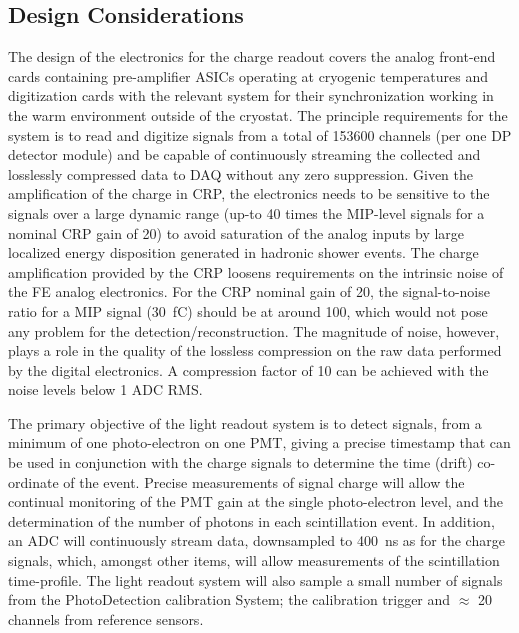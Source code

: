 \subsection{Design Considerations}
\label{sec:fddp-tpc-elec-des-consid}

The design of the electronics for the charge readout covers the analog front-end cards containing pre-amplifier ASICs operating at cryogenic temperatures and digitization cards with the relevant system for their synchronization working in the warm environment outside of the cryostat. The principle requirements for the system is to read and digitize signals from a total of \num{153600} channels (per one DP detector module) and be capable of continuously streaming the collected and losslessly compressed data to DAQ without any zero suppression. Given the amplification of the charge in CRP, the electronics needs to be sensitive to the signals over a large dynamic range (up-to \num{40} times the MIP-level signals for a nominal CRP gain of \num{20}) to avoid saturation of the analog inputs by large localized energy disposition generated in hadronic shower events. The charge amplification provided by the CRP loosens requirements on the intrinsic noise of the FE analog electronics. For the CRP nominal gain of \num{20}, the signal-to-noise ratio for a MIP signal (\SI{30}{fC}) should be at around \num{100}, which would not pose any problem for the detection/reconstruction. The magnitude of noise, however, plays a role in the quality of the lossless compression on the raw data performed by the digital electronics. A compression factor of \num{10} can be achieved with the noise levels below \num{1} ADC RMS.  %

The primary objective of the light readout system is to detect signals, from a minimum of one photo-electron on one PMT, giving a precise timestamp that can be used in conjunction with the charge signals to determine the time (drift) co-ordinate of the event.  Precise measurements of signal charge will allow the continual monitoring of the PMT gain at the single photo-electron level, and the determination of the number of photons in each scintillation event.  In addition, an ADC will continuously stream data, downsampled to \SI{400}{ns} as for the charge signals,  which, amongst other items, will allow measurements of the scintillation time-profile. The light readout system will also sample a small number of signals from the PhotoDetection calibration System; the calibration trigger and $\approx$ 20 channels from reference sensors.

